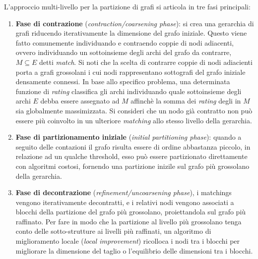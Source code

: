 L'approccio multi-livello per la partizione di grafi si articola in tre fasi principali:
\begin{enumerate}
    \item \textbf{Fase di contrazione} (\textit{contraction/coarsening phase}):
    si crea una gerarchia di grafi riducendo iterativamente la dimensione del grafo iniziale.
    Questo viene fatto comunemente individuando e contraendo coppie di nodi adiacenti, ovvero individuando un
    sottoinsieme degli archi del grafo da contrarre, $M \subseteq E $ detti \textit{match}.
    Si noti che la scelta di contrarre coppie di nodi adiacienti porta a grafi grossolani i cui nodi rappresentano
    sottografi del grafo iniziale densamente connessi.
    In base allo specifico problema, una determinata funzione di \textit{rating} classifica gli archi individuando
    quale sottoinsieme degli archi $E$ debba essere assegnato ad $M$ affinch\`e la somma dei \textit{rating} degli in
    $M$ sia globalmente massimizzata.
    Si consideri che un nodo gi\`a contratto non pu\`o essere pi\`u coinvolto in un ulteriore \textit{matching}
    allo stesso livello della gerarchia.
    \item \textbf{Fase di partizionamento iniziale} (\textit{initial partitioning phase}): quando a seguito delle
    contazioni il grafo risulta essere di ordine abbastanza piccolo, in relazione ad un qualche threshold,
    esso pu\`o essere partizionato direttamente con algoritmi costosi, fornendo una partizione inizile sul grafo
    pi\`u grossolano della gerarchia.
    \item \textbf{Fase di decontrazione} (\textit{refinement/uncoarsening phase}), i matchings vengono iterativamente
    decontratti, e i relativi nodi vengono associati a blocchi della partizione del grafo pi\`u grossolano,
    proiettandola sul grafo pi\`u raffinato.
    Per fare in modo che la partizione al livello pi\`u grossolano tenga conto delle sotto-strutture ai livelli
    pi\`u raffinati, un algoritmo di miglioramento locale (\textit{local improvement}) ricolloca i nodi tra i
    blocchi per migliorare la dimensione del taglio o l'equilibrio delle dimensioni tra i blocchi.
\end{enumerate}